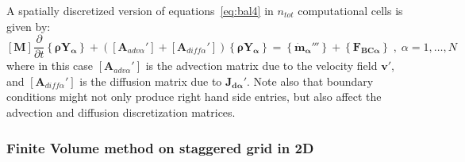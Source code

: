 \documentclass[12pt]{article}
\begin{document}
A spatially discretized version of equations~\eqref{eq:bal4} in $n_{tot}$ computational cells is given by:
%
\begin{equation}
\left[ \mathbf{M} \right] \frac{\partial}{\partial t} \left\{ \mathbf{\rho Y_\alpha} \right\} + \left( \left[ \mathbf{A}_{adv \alpha}'  \right] +\left[ \mathbf{A}_{diff \alpha}' \right] \right) \left\{ \mathbf{\rho Y_\alpha} \right\}   =  \left\{  \mathbf{\dot{m}_\alpha'''} \right\} +  \left\{ \mathbf{F_{BC \alpha}} \right\} \; , \; \alpha=1,\dots,N \label{eq:discbal4}
\end{equation}
%
where in this case $ \left[ \mathbf{A}_{adv \alpha}'  \right]$ is the advection matrix due to the velocity field $\mathbf{v}'$, and  $\left[ \mathbf{A}_{diff \alpha}' \right]$ is the diffusion matrix due to $ \mathbf{J_{d \alpha}'} $. Note also that boundary conditions might not only produce right hand side entries, but also affect the advection and diffusion discretization matrices.






\subsubsection{Finite Volume method on staggered grid in 2D}
\end{document}
